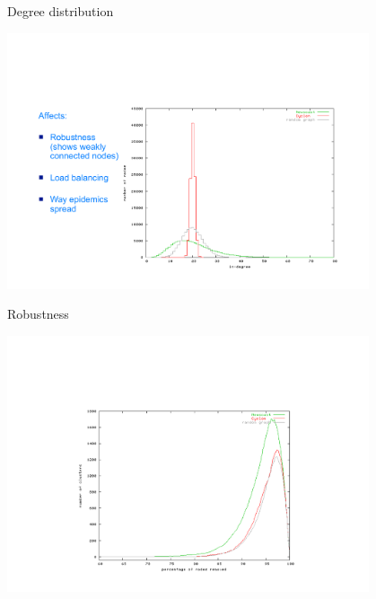 \begin{frame}{Degree distribution}
	
\begin{center}
\includegraphics[width=0.8\textwidth]{figs/11/degree}	
\end{center}



	
\end{frame}

\begin{frame}{Robustness}
	
\begin{center}
\includegraphics[width=0.8\textwidth]{figs/11/robustness}	
\end{center}

\end{frame}

